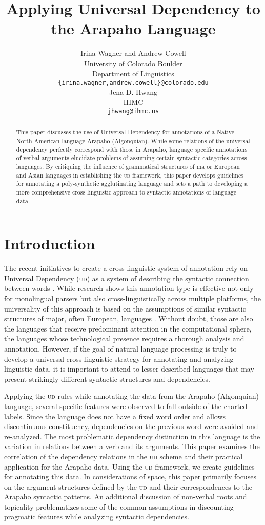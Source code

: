 \documentclass[11pt]{article}
\title{Applying Universal Dependency to the Arapaho Language}
\author{Irina Wagner and Andrew Cowell\\
  University of Colorado Boulder\\
  Department of Linguistics\\
  {\tt \{irina.wagner,andrew.cowell\}@colorado.edu} \\\And
  Jena D. Hwang\\
  IHMC\\
  {\tt jhwang@ihmc.us}}
\date{}
\begin{document}
\maketitle
\begin{abstract}

  This paper discusses the use of Universal Dependency for annotations of a Native North American language Arapaho (Algonquian). While some relations of the universal dependency perfectly correspond with those in Arapaho, language specific annotations of verbal arguments elucidate problems of assuming certain syntactic categories across languages. By critiquing the influence of grammatical structures of major European and Asian languages in establishing the \textsc{ud} framework, this paper develops guidelines for annotating a poly-synthetic agglutinating language and sets a path to developing a more comprehensive cross-linguistic approach to syntactic annotations of language data. 
 \end{abstract}

\section{Introduction}
	The recent initiatives to create a cross-linguistic system of annotation rely on Universal Dependency (\textsc{ud}) as a system of describing the syntactic connection between words \cite{Nivre2015,Marneffe2014}. While research shows this annotation type is effective not only for monolingual parsers but also cross-linguistically across multiple platforms, the universality of this approach is based on the assumptions of similar syntactic structures of major, often European, languages \cite{McDonald2013}. Without doubt, those are also the languages that receive predominant attention in the computational sphere, the languages whose technological presence requires a thorough analysis and annotation. However, if the goal of natural language processing is truly to develop a universal cross-linguistic strategy for annotating and analyzing linguistic data, it is important to attend to lesser described languages that may present strikingly different syntactic structures and dependencies. 

	Applying the \textsc{ud} rules while annotating the data from the Arapaho (Algonquian) language, several specific features were observed to fall outside of the charted labels. Since the language does not have a fixed word order and allows discontinuous constituency, dependencies on the previous word were avoided and re-analyzed. The most problematic dependency distinction in this language is the variation in relations between a verb and its arguments. This paper examines the correlation of the dependency relations in the \textsc{ud} scheme and their practical application for the Arapaho data. Using the \textsc{ud} framework, we create guidelines for annotating this data. In considerations of space, this paper primarily focuses on the argument structures defined by the \textsc{ud} and their correspondences to the Arapaho syntactic patterns. An additional discussion of non-verbal roots and topicality problematizes some of the common assumptions in discounting pragmatic features while analyzing syntactic dependencies. 
    
\end{document}
